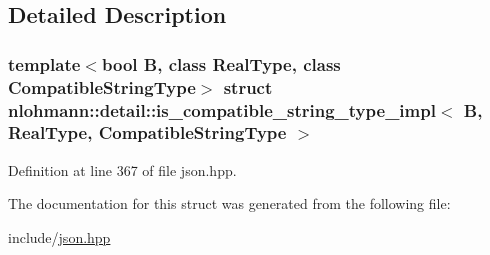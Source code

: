 \subsection{Detailed Description}
\subsubsection*{template$<$bool B, class Real\+Type, class Compatible\+String\+Type$>$\newline
struct nlohmann\+::detail\+::is\+\_\+compatible\+\_\+string\+\_\+type\+\_\+impl$<$ B, Real\+Type, Compatible\+String\+Type $>$}



Definition at line 367 of file json.\+hpp.



The documentation for this struct was generated from the following file\+:\begin{DoxyCompactItemize}
\item 
include/\hyperlink{json_8hpp}{json.\+hpp}\end{DoxyCompactItemize}
